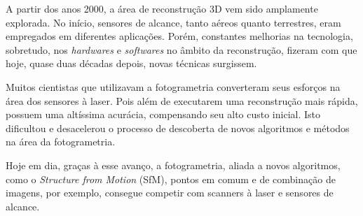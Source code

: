 \documentclass[a4paper,12pt,oneside,onecolumn,final,fleqn]{repUERJ}
\theoremstyle{plain}
\theoremstyle{definition}
\begin{document}

A partir dos anos 2000, a área de reconstrução 3D vem sido amplamente explorada. No início, sensores de alcance, tanto aéreos quanto terrestres, eram empregados em diferentes aplicações. Porém, constantes melhorias na tecnologia, sobretudo, nos {\it hardwares} e {\it softwares} no âmbito da reconstrução, fizeram com que hoje, quase duas décadas depois, novas técnicas surgissem.

Muitos cientistas que utilizavam a fotogrametria converteram seus esforços na área dos sensores à laser. Pois além de executarem uma reconstrução mais rápida, possuem uma altíssima acurácia, compensando seu alto custo inicial. Isto dificultou e desacelerou o processo de descoberta de novos algoritmos e métodos na área da fotogrametria. 

Hoje em dia, graças à esse avanço, a fotogrametria, aliada a novos algoritmos, como o {\it Structure from Motion} (SfM), pontos em comum e de combinação de imagens, por exemplo, consegue competir com scanners à laser e sensores de alcance. 
\end{document}

